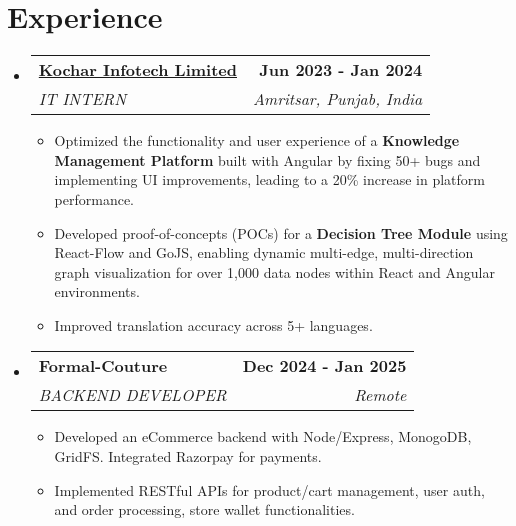 \documentclass[letterpaper,11pt]{article}
\makeatletter
\newcommand{\resumeItem}[1]{
  \item\small{
    {#1 \vspace{-2pt}}
  }
}
\newcommand{\resumeSubheading}[4]{
  \vspace{-2pt}\item
    \begin{tabular*}{1.0\textwidth}[t]{l@{\extracolsep{\fill}}r}
      \textbf{#1} & \textbf{\small #2} \\
      \textit{\small#3} & \textit{\small #4} \\
    \end{tabular*}\vspace{-7pt}
}
\newcommand{\resumeSubHeadingListStart}{\begin{itemize}[leftmargin=0.0in, label={}]}
\newcommand{\resumeSubHeadingListEnd}{\end{itemize}}
\newcommand{\resumeItemListStart}{\justify \begin{itemize} \vspace{-4pt}}
\newcommand{\resumeItemListEnd}{\end{itemize}\vspace{-1pt}}
\makeatother
\begin{document}
\section{Experience}
  \resumeSubHeadingListStart
    \resumeSubheading
      {\href{https://www.kochartech.com/}{Kochar Infotech Limited}}{Jun 2023 - Jan 2024}
      {IT INTERN}{Amritsar, Punjab, India}
      \resumeItemListStart
        \resumeItem{Optimized the functionality and user experience of a \textbf{Knowledge Management Platform} built with Angular by fixing 50+ bugs and implementing UI improvements, leading to a 20\% increase in platform performance.}
        \resumeItem{Developed proof-of-concepts (POCs) for a \textbf{Decision Tree Module} using React-Flow and GoJS, enabling dynamic multi-edge, multi-direction graph visualization for over 1,000 data nodes within React and Angular environments.}
        \resumeItem{Improved translation accuracy across 5+ languages.}
      \resumeItemListEnd
    
    \resumeSubheading
      {Formal-Couture}{Dec 2024 - Jan 2025}
      {BACKEND DEVELOPER}{Remote}
      \resumeItemListStart
        \resumeItem{Developed an eCommerce backend with Node/Express, MonogoDB, GridFS. Integrated Razorpay for payments.}
        \resumeItem{Implemented RESTful APIs for product/cart management, user auth, and order processing, store wallet functionalities.}
      \resumeItemListEnd
  \resumeSubHeadingListEnd




\end{document}
